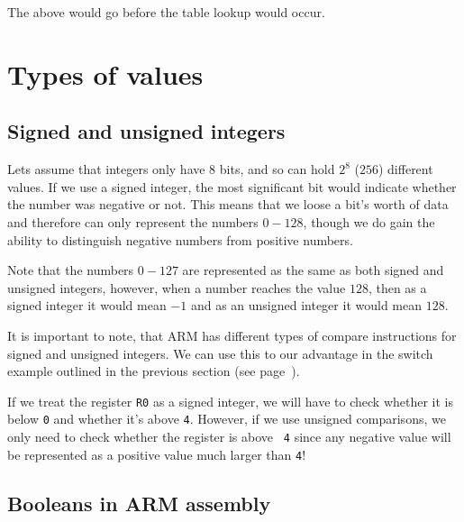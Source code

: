 
The above would go before the table lookup would occur.

\section{Types of values}

\subsection{Signed and unsigned integers}
\label{subsection:signed_unsigned_integers}

Lets assume that integers only have 8 bits, and so can hold $2^8$ ($256$)
different values. If we use a signed integer, the most significant bit would
indicate whether the number was negative or not. This means that we loose a
bit's worth of data and therefore can only represent the numbers $0-128$, though
we do gain the ability to distinguish negative numbers from positive numbers.


Note that the numbers $0-127$ are represented as the same as both signed and
unsigned integers, however, when a number reaches the value $128$, then as a
signed integer it would mean $-1$ and as an unsigned integer it would mean
$128$.

It is important to note, that ARM has different types of compare instructions
for signed and unsigned integers. We can use this to our advantage in the switch
example outlined in the previous section (see page~\pageref{sec:switch}).

If we treat the register {\tt R0} as a signed integer, we will have to check
whether it is below {\tt 0} and whether it's above {\tt 4}. However, if we use
unsigned comparisons, we only need to check whether the register is above {\tt
4} since any negative value will be represented as a positive value much larger
than {\tt 4}!


\subsection{Booleans in ARM assembly}

